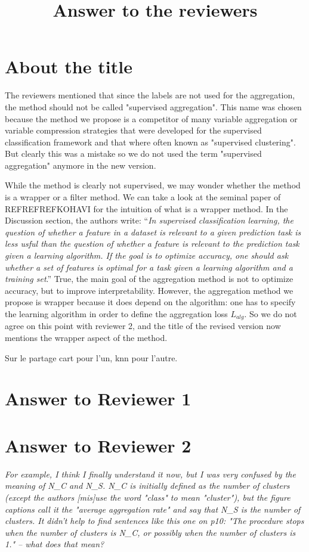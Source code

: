 \documentclass[a4paper,11pt]{article}
\title{Answer to the reviewers}
\begin{document}
\maketitle

\section{About the title}
The reviewers mentioned that since the labels are not used for the aggregation, the method should not be called "supervised aggregation". This name was chosen because the method we propose is a competitor of many variable aggregation or variable compression strategies that were developed for the supervised classification framework and that where often known as "supervised clustering". But clearly this was a mistake so we do not used the term "supervised aggregation" anymore in the new version.

While the method is clearly not supervised, we may wonder whether the method is a wrapper or a filter method. We can take a look at the seminal paper of REFREFREFKOHAVI for the intuition of what is a wrapper method. In the Discussion section, the authors write: ``\emph{In supervised classification learning, the question of whether a feature in a dataset is relevant to a given prediction task is less usful than the question of whether a feature is relevant to the prediction task given a learning algorithm. If the goal is to optimize accuracy, one should ask whether a set of features is optimal for a task given a learning algorithm and a training set}.''  True, the main goal of the aggregation method is not to optimize accuracy, but to improve interpretability. However, the aggregation method we propose is wrapper because it does depend on the algorithm: one has to specify the learning algorithm in order to define the aggregation loss $L_{alg}$. So we do not agree on this point with reviewer 2, and the title of the revised version now mentions the wrapper aspect of the method.


Sur le partage cart pour l'un, knn pour l'autre.

\section{Answer to Reviewer 1}



\section{Answer to Reviewer 2}
\emph{For example, I think I finally understand it now, but I was very confused by the meaning of N_C and N_S.  N_C is initially defined as the number of clusters (except the authors [mis]use the word "class" to mean "cluster"), but the figure captions call it the "average aggregation rate" and say that N_S is the number of clusters.  It didn't help to find sentences like this one on p10: "The procedure stops when the number of clusters is N_C, or possibly when the number of clusters is 1." -- what does that mean?}
\end{document}
